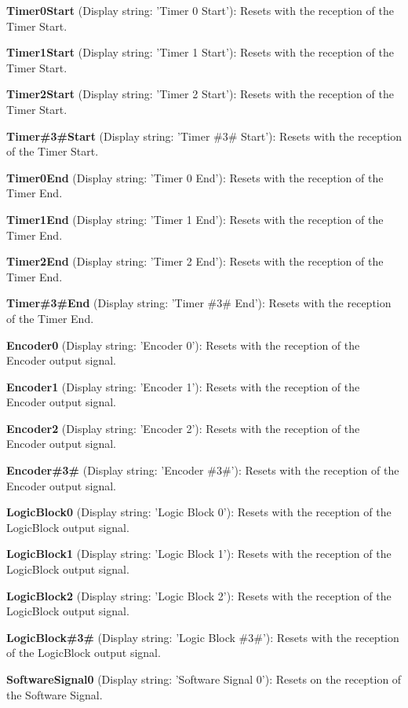 \begin{DoxyItemize}
\item {\bfseries Timer0\+Start} (Display string\+: 'Timer 0 Start')\+: Resets with the reception of the Timer Start.
\item {\bfseries Timer1\+Start} (Display string\+: 'Timer 1 Start')\+: Resets with the reception of the Timer Start.
\item {\bfseries Timer2\+Start} (Display string\+: 'Timer 2 Start')\+: Resets with the reception of the Timer Start.
\item {\bfseries Timer\#3\#Start} (Display string\+: 'Timer \#3\# Start')\+: Resets with the reception of the Timer Start.
\item {\bfseries Timer0\+End} (Display string\+: 'Timer 0 End')\+: Resets with the reception of the Timer End.
\item {\bfseries Timer1\+End} (Display string\+: 'Timer 1 End')\+: Resets with the reception of the Timer End.
\item {\bfseries Timer2\+End} (Display string\+: 'Timer 2 End')\+: Resets with the reception of the Timer End.
\item {\bfseries Timer\#3\#End} (Display string\+: 'Timer \#3\# End')\+: Resets with the reception of the Timer End.
\item {\bfseries Encoder0} (Display string\+: 'Encoder 0')\+: Resets with the reception of the Encoder output signal.
\item {\bfseries Encoder1} (Display string\+: 'Encoder 1')\+: Resets with the reception of the Encoder output signal.
\item {\bfseries Encoder2} (Display string\+: 'Encoder 2')\+: Resets with the reception of the Encoder output signal.
\item {\bfseries Encoder\#3\#} (Display string\+: 'Encoder \#3\#')\+: Resets with the reception of the Encoder output signal.
\item {\bfseries Logic\+Block0} (Display string\+: 'Logic Block 0')\+: Resets with the reception of the Logic\+Block output signal.
\item {\bfseries Logic\+Block1} (Display string\+: 'Logic Block 1')\+: Resets with the reception of the Logic\+Block output signal.
\item {\bfseries Logic\+Block2} (Display string\+: 'Logic Block 2')\+: Resets with the reception of the Logic\+Block output signal.
\item {\bfseries Logic\+Block\#3\#} (Display string\+: 'Logic Block \#3\#')\+: Resets with the reception of the Logic\+Block output signal.
\item {\bfseries Software\+Signal0} (Display string\+: 'Software Signal 0')\+: Resets on the reception of the Software Signal.

\end{DoxyItemize}

